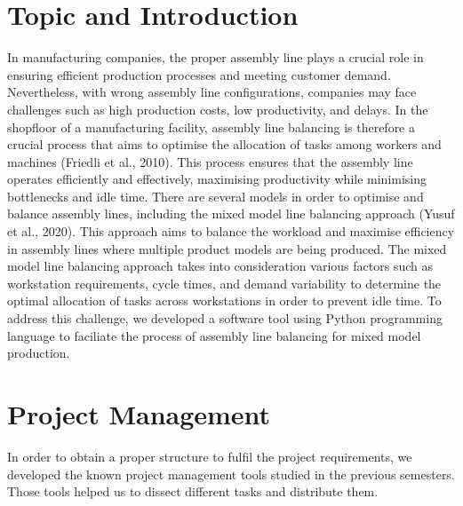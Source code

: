 \pagestyle{fancy}

\section{Topic and Introduction}
\label{sec:Topic_and_Introduction}
In manufacturing companies, the proper assembly line plays a crucial role in ensuring efficient production processes and meeting customer demand. Nevertheless, with wrong assembly line configurations, companies may face challenges such as high production costs, low productivity, and delays. In the shopfloor of a manufacturing facility, assembly line balancing is therefore a crucial process that aims to optimise the allocation of tasks among workers and machines (Friedli et al., 2010). This process ensures that the assembly line operates efficiently and effectively, maximising productivity while minimising bottlenecks and idle time. There are several models in order to optimise and balance assembly lines, including the mixed model line balancing approach (Yusuf et al., 2020). This approach aims to balance the workload and maximise efficiency in assembly lines where multiple product models are being produced. The mixed model line balancing approach takes into consideration various factors such as workstation requirements, cycle times, and demand variability to determine the optimal allocation of tasks across workstations in order to prevent idle time. To address this challenge, we developed a software tool using Python programming language to faciliate the process of assembly line balancing for mixed model production. 

\section{Project Management}
In order to obtain a proper structure to fulfil the project requirements, we developed the known project management tools studied in the previous semesters. Those tools helped us to dissect different tasks and distribute them.

